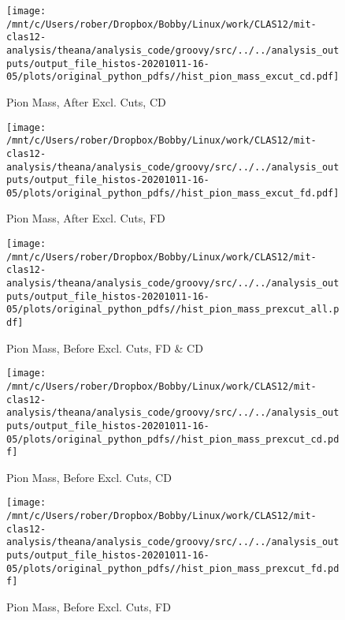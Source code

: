 \documentclass{article}
\begin{document}
\begin{landscape}
    \begin{figure}[h]
        \centering

        \texttt{[image: /mnt/c/Users/rober/Dropbox/Bobby/Linux/work/CLAS12/mit-clas12-analysis/theana/analysis\_code/groovy/src/../../analysis\_outputs/output\_file\_histos-20201011-16-05/plots/original\_python\_pdfs//hist\_pion\_mass\_excut\_cd.pdf]}
        \captionsetup{textformat=empty,labelformat=blank}
        \caption{Pion Mass, After Excl. Cuts, CD}
    \end{figure}
    \clearpage
    
    \begin{figure}[h]
        \centering

        \texttt{[image: /mnt/c/Users/rober/Dropbox/Bobby/Linux/work/CLAS12/mit-clas12-analysis/theana/analysis\_code/groovy/src/../../analysis\_outputs/output\_file\_histos-20201011-16-05/plots/original\_python\_pdfs//hist\_pion\_mass\_excut\_fd.pdf]}
        \captionsetup{textformat=empty,labelformat=blank}
        \caption{Pion Mass, After Excl. Cuts, FD}
    \end{figure}
    \clearpage
    
    \begin{figure}[h]
        \centering

        \texttt{[image: /mnt/c/Users/rober/Dropbox/Bobby/Linux/work/CLAS12/mit-clas12-analysis/theana/analysis\_code/groovy/src/../../analysis\_outputs/output\_file\_histos-20201011-16-05/plots/original\_python\_pdfs//hist\_pion\_mass\_prexcut\_all.pdf]}
        \captionsetup{textformat=empty,labelformat=blank}
        \caption{Pion Mass, Before Excl. Cuts, FD \& CD}
    \end{figure}
    \clearpage
    
    \begin{figure}[h]
        \centering

        \texttt{[image: /mnt/c/Users/rober/Dropbox/Bobby/Linux/work/CLAS12/mit-clas12-analysis/theana/analysis\_code/groovy/src/../../analysis\_outputs/output\_file\_histos-20201011-16-05/plots/original\_python\_pdfs//hist\_pion\_mass\_prexcut\_cd.pdf]}
        \captionsetup{textformat=empty,labelformat=blank}
        \caption{Pion Mass, Before Excl. Cuts, CD}
    \end{figure}
    \clearpage
    
    \begin{figure}[h]
        \centering

        \texttt{[image: /mnt/c/Users/rober/Dropbox/Bobby/Linux/work/CLAS12/mit-clas12-analysis/theana/analysis\_code/groovy/src/../../analysis\_outputs/output\_file\_histos-20201011-16-05/plots/original\_python\_pdfs//hist\_pion\_mass\_prexcut\_fd.pdf]}
        \captionsetup{textformat=empty,labelformat=blank}
        \caption{Pion Mass, Before Excl. Cuts, FD}
    \end{figure}
    \clearpage
    

\end{landscape}
\end{document}
